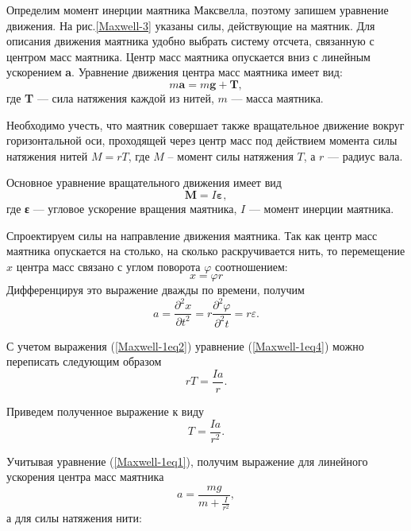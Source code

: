 \documentclass[14pt,a4paper,oneside]{extarticle}	%
\begin{document}
	Определим момент инерции маятника Максвелла, поэтому запишем уравнение движения.
	На рис.\ref{Maxwell-3} указаны силы, действующие на маятник.
	Для описания движения маятника удобно выбрать систему отсчета, связанную с центром масс маятника.
	Центр масс маятника опускается вниз с линейным ускорением \textbf{a}.
	Уравнение движения центра масс маятника имеет вид:
	\begin{equation}\label{Maxwell-1eq1}
	m\textbf{a} = m\textbf{g} + \textbf{T},
	\end{equation}
	где  \textbf{T}  — сила натяжения каждой из нитей, $ m $ — масса маятника.
	
	Необходимо учесть, что маятник совершает также вращательное движение вокруг горизонтальной оси, проходящей через центр масс под действием момента силы натяжения нитей $ M = r T $, где $ M $ – момент силы натяжения $ T $, а $ r $ — радиус вала.
	
	Основное уравнение вращательного движения имеет вид
	\begin{equation}\label{Maxwell-1eq2}
	\textbf{M} = I\textbf{ε},
	\end{equation}
	где \textbf{ε} — угловое ускорение вращения маятника, $ I $ — момент инерции маятника.
	
	Спроектируем силы на направление движения маятника.  
	Так как центр масс маятника опускается на столько, на сколько раскручивается нить, то перемещение $ x $ центра масс связано с углом поворота $ \varphi $ соотношением:
	\begin{equation}\label{Maxwell-1eq3}
	x = \varphi r
	\end{equation}
	Дифференцируя это выражение дважды по времени, получим
	\begin{equation}\label{Maxwell-1eq4}
	a = \frac{\partial^{2} x}{\partial t^{2}} = r\frac{\partial^{2} \varphi}{\partial^{2} t} = r \varepsilon.
	\end{equation}
	
	С учетом выражения (\ref{Maxwell-1eq2}) уравнение (\ref{Maxwell-1eq4}) можно переписать следующим образом 
	\begin{equation}\label{Maxwell-1eq5}
	rT = \frac{Ia}{r}.
	\end{equation}
	
	Приведем полученное выражение к виду
	\begin{equation}\label{Maxwell-1eq6}
	T = \frac{Ia}{r^{2}}.
	\end{equation}
	
	Учитывая уравнение (\ref{Maxwell-1eq1}), получим выражение для линейного ускорения центра масс маятника
	\begin{equation}\label{Maxwell-1eq7}
	a = \frac{mg}{m + \frac{I}{r^{2}}},
	\end{equation}
	а для силы натяжения нити:
	
\end{document}
